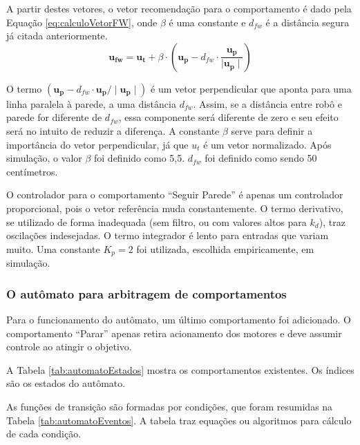		A partir destes vetores, o vetor recomendação para o comportamento é dado pela Equação
		\ref{eq:calculoVetorFW}, onde $\beta$ é uma constante e $d_{fw}$ é a distância segura já
		citada anteriormente. 
		\begin{equation}
			\label{eq:calculoVetorFW}
			\mathbf{u_{fw}} = \mathbf{u_t} + \beta \cdot \left(\mathbf{u_p} - d_{fw} \cdot 
			\frac{\mathbf{u_p}}{\mid \mathbf{u_p} \mid}\right)
		\end{equation}
		
		O termo $(\mathbf{u_p} - d_{fw} \cdot \mathbf{u_p}/\mid\mathbf{u_p}\mid)$ é um vetor 
		perpendicular que aponta para uma linha paralela à parede, a uma distância $d_{fw}$. 
		Assim, se a distância entre robô e parede for diferente de $d_{fw}$, essa componente será 
		diferente de zero e seu efeito será no intuito de reduzir a diferença. A constante $\beta$
		serve para definir a importância do vetor perpendicular, já que $u_t$ é um vetor
		normalizado. Após simulação, o valor $\beta$ foi definido como 5,5. $d_{fw}$ foi definido
		como sendo 50 centímetros.
		
		O controlador para o comportamento ``Seguir Parede'' é apenas um controlador proporcional,
		pois o vetor referência muda constantemente. O termo derivativo, se utilizado de forma 
		inadequada (sem filtro, ou com valores altos para $k_d$), traz oscilações indesejadas. O 
		termo integrador é lento para entradas que variam muito. Uma constante $K_p = 2$ foi 
		utilizada, escolhida empiricamente, em simulação.
		
		\subsubsection{O autômato para arbitragem de comportamentos}
	
		Para o funcionamento do autômato, um último comportamento foi adicionado. O comportamento 
		``Parar'' apenas retira acionamento dos motores e deve assumir controle ao atingir o 
		objetivo.
		
		A Tabela \ref{tab:automatoEstados} mostra os comportamentos existentes. Os índices são
		os estados do autômato. 
	
		
	
		As funções de transição são formadas por condições, que foram resumidas na Tabela 
		\ref{tab:automatoEventos}. A tabela traz equações ou algoritmos para cálculo de cada 
		condição.
		
		
		

